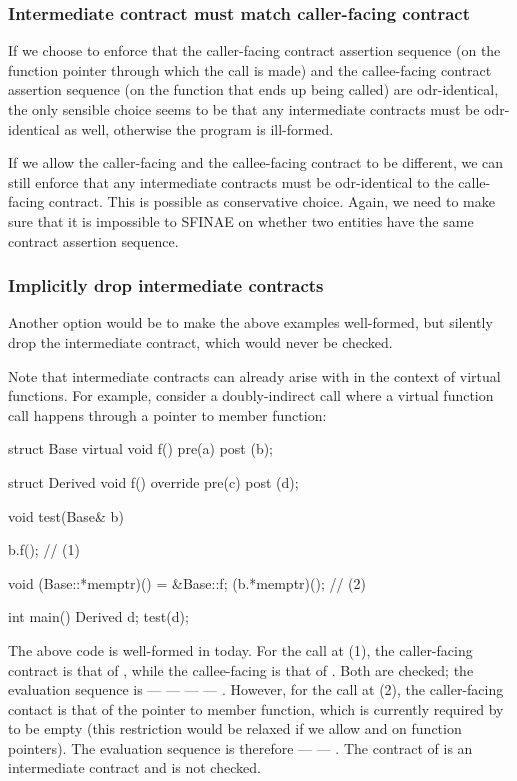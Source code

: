
\subsubsection{Intermediate contract must match caller-facing contract}
\label{intermediatematch}

If we choose to enforce that the caller-facing contract assertion sequence (on the function pointer through which the call is made) and the callee-facing contract assertion sequence (on the function that ends up being called) are odr-identical, the only sensible choice seems to be that any intermediate contracts must be odr-identical as well, otherwise the program is ill-formed.

If we allow the caller-facing and the callee-facing contract to be different, we can still enforce that any intermediate contracts must be odr-identical to the calle-facing contract. This is possible as conservative choice. Again, we need to make sure that it is impossible to SFINAE on whether two entities have the same contract assertion sequence. 

\subsubsection{Implicitly drop intermediate contracts}
\label{implicitdrop}

Another option would be to make the above examples well-formed, but silently drop the intermediate contract, which would never be checked. 

Note that intermediate contracts can already arise with \cite{P2900R8} in the context of virtual functions. For example, consider a doubly-indirect call where a virtual function call happens through a pointer to member function:
\begin{codeblock}
struct Base {
  virtual void f() pre(a) post (b);
}

struct Derived {
  void f() override pre(c) post (d);
}

void test(Base& b) {
  b.f();  // (1)
  
  void (Base::*memptr)() = &Base::f;
  (b.*memptr)();  // (2)
}

int main() {
  Derived d;
  test(d);
}
\end{codeblock}
The above code is well-formed in \cite{P2900R8} today. For the call at (1), the caller-facing contract is that of , while the callee-facing is that of . Both are checked; the evaluation sequence is  ---  ---  ---  --- . However, for the call at (2), the caller-facing contact is that of the pointer to member function, which is currently required by \cite{P2900R8} to be empty (this restriction would be relaxed if we allow  and  on function pointers). The evaluation sequence is therefore  ---  --- . The contract of  is an intermediate contract and is not checked.

